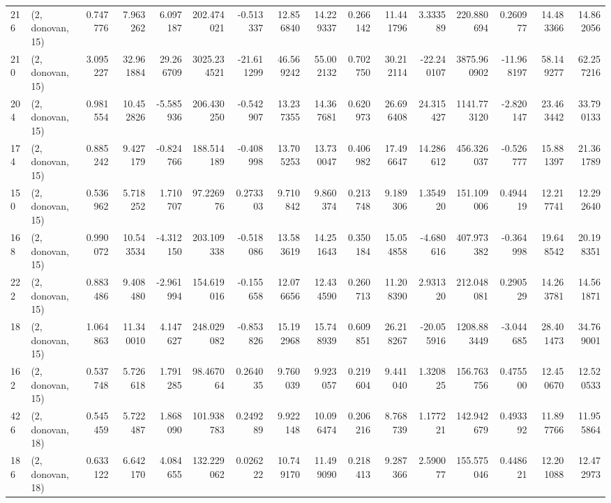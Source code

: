 \begin{tabular}{llrrrrrrrrrrrrrr}
216 &  (2, donovan, 15) &   0.747776 &   7.963262 &   6.097187 &   202.474021 &  -0.513337 &  12.856840 &  14.229337 &  0.266142 &  11.441796 &   3.333589 &   220.880694 &   0.260977 &  14.483366 &  14.862056 \\
210 &  (2, donovan, 15) &   3.095227 &  32.961884 &  29.266709 &  3025.234521 & -21.611299 &  46.569242 &  55.002132 &  0.702750 &  30.212114 & -22.240107 &  3875.960902 & -11.968197 &  58.149277 &  62.257216 \\
204 &  (2, donovan, 15) &   0.981554 &  10.452826 &  -5.585936 &   206.430250 &  -0.542907 &  13.237355 &  14.367681 &  0.620973 &  26.696408 &  24.315427 &  1141.773120 &  -2.820147 &  23.463442 &  33.790133 \\
174 &  (2, donovan, 15) &   0.885242 &   9.427179 &  -0.824766 &   188.514189 &  -0.408998 &  13.705253 &  13.730047 &  0.406982 &  17.496647 &  14.286612 &   456.326037 &  -0.526777 &  15.881397 &  21.361789 \\
150 &  (2, donovan, 15) &   0.536962 &   5.718252 &   1.710707 &    97.226976 &   0.273303 &   9.710842 &   9.860374 &  0.213748 &   9.189306 &   1.354920 &   151.109006 &   0.494419 &  12.217741 &  12.292640 \\
168 &  (2, donovan, 15) &   0.990072 &  10.543534 &  -4.312150 &   203.109338 &  -0.518086 &  13.583619 &  14.251643 &  0.350184 &  15.054858 &  -4.680616 &   407.973382 &  -0.364998 &  19.648542 &  20.198351 \\
222 &  (2, donovan, 15) &   0.883486 &   9.408480 &  -2.961994 &   154.619016 &  -0.155658 &  12.076656 &  12.434590 &  0.260713 &  11.208390 &   2.931320 &   212.048081 &   0.290529 &  14.263781 &  14.561871 \\
18  &  (2, donovan, 15) &   1.064863 &  11.340010 &   4.147627 &   248.029082 &  -0.853826 &  15.192968 &  15.748939 &  0.609851 &  26.218267 & -20.055916 &  1208.883449 &  -3.044685 &  28.401473 &  34.769001 \\
162 &  (2, donovan, 15) &   0.537748 &   5.726618 &   1.791285 &    98.467064 &   0.264035 &   9.760039 &   9.923057 &  0.219604 &   9.441040 &   1.320825 &   156.763756 &   0.475500 &  12.450670 &  12.520533 \\
426 &  (2, donovan, 18) &   0.545459 &   5.722487 &   1.868090 &   101.938783 &   0.249289 &   9.922148 &  10.096474 &  0.206216 &   8.768739 &   1.177221 &   142.942679 &   0.493392 &  11.897766 &  11.955864 \\
186 &  (2, donovan, 18) &   0.633122 &   6.642170 &   4.084655 &   132.229062 &   0.026222 &  10.749170 &  11.499090 &  0.218413 &   9.287366 &   2.590077 &   155.575046 &   0.448621 &  12.201088 &  12.472973 \\

\end{tabular}
